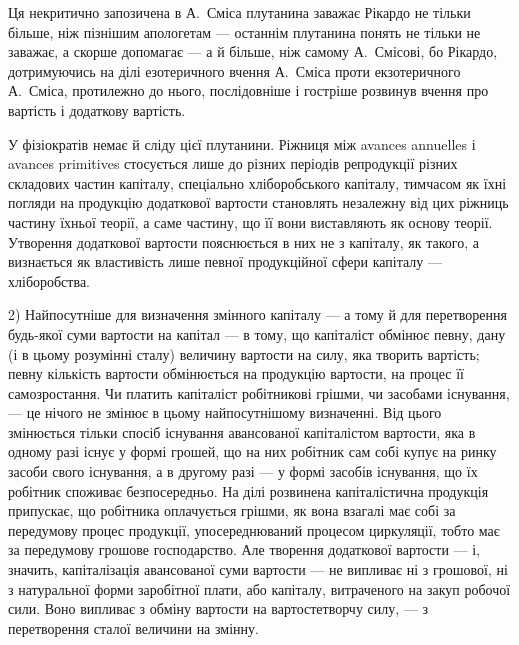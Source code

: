 
Ця некритично запозичена в А.~Сміса плутанина заважає Рікардо
не тільки більше, ніж пізнішим апологетам — останнім плутанина понять
не тільки не заважає, а скорше допомагає — а й більше, ніж самому
А.~Смісові, бо Рікардо, дотримуючись на ділі езотеричного вчення
А.~Сміса проти екзотеричного А.~Сміса, протилежно до нього, послідовніше
і гостріше розвинув вчення про вартість і додаткову вартість.

У фізіократів немає й сліду цієї плутанини. Ріжниця між avances
annuelles і avances primitives стосується лише до різних періодів репродукції
різних складових частин капіталу, спеціально хліборобського капіталу,
тимчасом як їхні погляди на продукцію додаткової вартости становлять
незалежну від цих ріжниць частину їхньої теорії, а саме частину,
що її вони виставляють як основу теорії. Утворення додаткової вартости
пояснюється в них не з капіталу, як такого, а визнається як властивість
лише певної продукційної сфери капіталу — хліборобства.

2) Найпосутніше для визначення змінного капіталу — а тому й для
перетворення будь-якої суми вартости на капітал — в тому, що капіталіст
обмінює певну, дану (і в цьому розумінні сталу) величину вартости на
силу, яка творить вартість; певну кількість вартости обмінюється на продукцію
вартости, на процес її самозростання. Чи платить капіталіст робітникові
грішми, чи засобами існування, — це нічого не змінює в цьому
найпосутнішому визначенні. Від цього змінюється тільки спосіб існування
авансованої капіталістом вартости, яка в одному разі існує у формі грошей,
що на них робітник сам собі купує на ринку засоби свого існування,
а в другому разі — у формі засобів існування, що їх робітник
споживає безпосередньо. На ділі розвинена капіталістична продукція
припускає, що робітника оплачується грішми, як вона взагалі має собі
за передумову процес продукції, упосереднюваний процесом циркуляції,
тобто має за передумову грошове господарство. Але творення додаткової
вартости — і, значить, капіталізація авансованої суми вартости — не випливає
ні з грошової, ні з натуральної форми заробітної плати, або капіталу,
витраченого на закуп робочої сили. Воно випливає з обміну вартости
на вартостетворчу силу, — з перетворення сталої величини на змінну.

